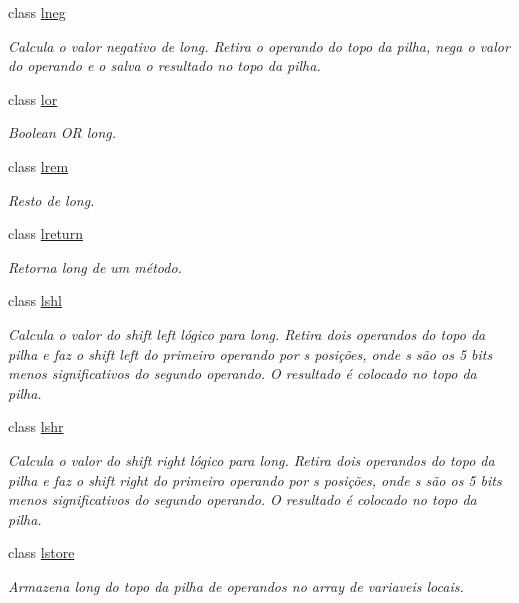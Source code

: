 \begin{DoxyCompactItemize}
class \hyperlink{class_instruction_impl_1_1lneg}{lneg}
\begin{DoxyCompactList}\small\item\em Calcula o valor negativo de long. Retira o operando do topo da pilha, nega o valor do operando e o salva o resultado no topo da pilha. \end{DoxyCompactList}\item 
class \hyperlink{class_instruction_impl_1_1lor}{lor}
\begin{DoxyCompactList}\small\item\em Boolean OR long. \end{DoxyCompactList}\item 
class \hyperlink{class_instruction_impl_1_1lrem}{lrem}
\begin{DoxyCompactList}\small\item\em Resto de long. \end{DoxyCompactList}\item 
class \hyperlink{class_instruction_impl_1_1lreturn}{lreturn}
\begin{DoxyCompactList}\small\item\em Retorna long de um método. \end{DoxyCompactList}\item 
class \hyperlink{class_instruction_impl_1_1lshl}{lshl}
\begin{DoxyCompactList}\small\item\em Calcula o valor do shift left lógico para long. Retira dois operandos do topo da pilha e faz o shift left do primeiro operando por s posições, onde s são os 5 bits menos significativos do segundo operando. O resultado é colocado no topo da pilha. \end{DoxyCompactList}\item 
class \hyperlink{class_instruction_impl_1_1lshr}{lshr}
\begin{DoxyCompactList}\small\item\em Calcula o valor do shift right lógico para long. Retira dois operandos do topo da pilha e faz o shift right do primeiro operando por s posições, onde s são os 5 bits menos significativos do segundo operando. O resultado é colocado no topo da pilha. \end{DoxyCompactList}\item 
class \hyperlink{class_instruction_impl_1_1lstore}{lstore}
\begin{DoxyCompactList}\small\item\em Armazena long do topo da pilha de operandos no array de variaveis locais. \end{DoxyCompactList}\item 

\end{DoxyCompactItemize}
